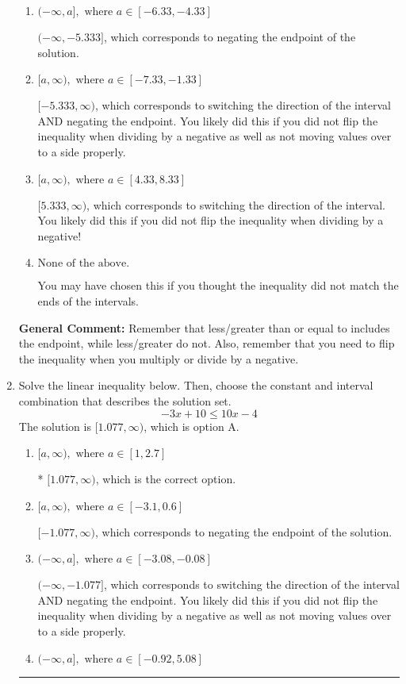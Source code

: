 \documentclass{extbook}[14pt]
\newcommand{\litem}[1]{\item #1

\rule{\textwidth}{0.4pt}}
\begin{document}
\begin{enumerate}
{\begin{enumerate}[label=\Alph*.]
* $(-\infty, 5.333]$, which is the correct option.
\item \( (-\infty, a], \text{ where } a \in [-6.33, -4.33] \)

 $(-\infty, -5.333]$, which corresponds to negating the endpoint of the solution.
\item \( [a, \infty), \text{ where } a \in [-7.33, -1.33] \)

 $[-5.333, \infty)$, which corresponds to switching the direction of the interval AND negating the endpoint. You likely did this if you did not flip the inequality when dividing by a negative as well as not moving values over to a side properly.
\item \( [a, \infty), \text{ where } a \in [4.33, 8.33] \)

 $[5.333, \infty)$, which corresponds to switching the direction of the interval. You likely did this if you did not flip the inequality when dividing by a negative!
\item \( \text{None of the above}. \)

You may have chosen this if you thought the inequality did not match the ends of the intervals.
\end{enumerate}

\textbf{General Comment:} Remember that less/greater than or equal to includes the endpoint, while less/greater do not. Also, remember that you need to flip the inequality when you multiply or divide by a negative.
}
\litem{
Solve the linear inequality below. Then, choose the constant and interval combination that describes the solution set.
\[ -3x + 10 \leq 10x -4 \]The solution is \( [1.077, \infty) \), which is option A.\begin{enumerate}[label=\Alph*.]
\item \( [a, \infty), \text{ where } a \in [1, 2.7] \)

* $[1.077, \infty)$, which is the correct option.
\item \( [a, \infty), \text{ where } a \in [-3.1, 0.6] \)

 $[-1.077, \infty)$, which corresponds to negating the endpoint of the solution.
\item \( (-\infty, a], \text{ where } a \in [-3.08, -0.08] \)

 $(-\infty, -1.077]$, which corresponds to switching the direction of the interval AND negating the endpoint. You likely did this if you did not flip the inequality when dividing by a negative as well as not moving values over to a side properly.
\item \( (-\infty, a], \text{ where } a \in [-0.92, 5.08] \)


\end{enumerate}}
\end{enumerate}
\end{document}
